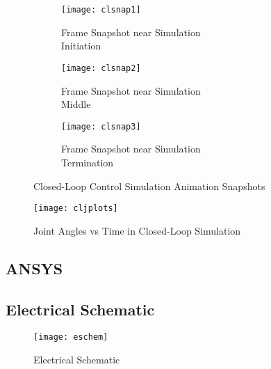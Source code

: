 \begin{figure}[htp]
  \center
  \begin{subfigure}[c]{0.33\textwidth}
    \center
    \texttt{[image: clsnap1]}
    \caption{Frame Snapshot near Simulation \\Initiation}
  \end{subfigure}%
  \begin{subfigure}[c]{0.33\textwidth}
    \center
    \texttt{[image: clsnap2]}
    \caption{Frame Snapshot near Simulation \\Middle}
  \end{subfigure}%
\begin{subfigure}[c]{0.33\textwidth}
  \center
  \texttt{[image: clsnap3]}
  \caption{Frame Snapshot near Simulation \\Termination}
\end{subfigure}
  \caption{Closed-Loop Control Simulation Animation Snapshots}
  \label{fig:clsnaps}
\end{figure}
\begin{figure}[htp]
  \center
  \texttt{[image: cljplots]}
  \caption{Joint Angles vs Time in Closed-Loop Simulation}
  \label{fig:cljplots}
\end{figure}


\newpage
\subsection{ANSYS}
\newpage
\subsection{Electrical Schematic}

\begin{figure}[htp]
  \centering
  \texttt{[image: eschem]}
  \caption{Electrical Schematic}
\end{figure}


